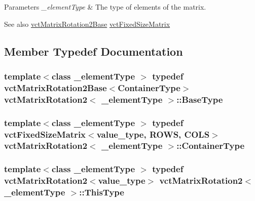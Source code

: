 \begin{DoxyParams}{Parameters}
{\em \+\_\+element\+Type} & The type of elements of the matrix.\\
\hline
\end{DoxyParams}
\begin{DoxySeeAlso}{See also}
\hyperlink{classvct_matrix_rotation2_base}{vct\+Matrix\+Rotation2\+Base} \hyperlink{classvct_fixed_size_matrix}{vct\+Fixed\+Size\+Matrix} 
\end{DoxySeeAlso}


\subsection{Member Typedef Documentation}
\hypertarget{classvct_matrix_rotation2_a6d9fad3de3e445606a22bf1a3e9da631}{}
\subsubsection[{Base\+Type}]{\setlength{\rightskip}{0pt plus 5cm}template$<$class \+\_\+element\+Type $>$ typedef {\bf vct\+Matrix\+Rotation2\+Base}$<${\bf Container\+Type}$>$ {\bf vct\+Matrix\+Rotation2}$<$ \+\_\+element\+Type $>$\+::{\bf Base\+Type}}\label{classvct_matrix_rotation2_a6d9fad3de3e445606a22bf1a3e9da631}
\hypertarget{classvct_matrix_rotation2_ab84e040499a56ef9c8ab6b3a57e09479}{}
\subsubsection[{Container\+Type}]{\setlength{\rightskip}{0pt plus 5cm}template$<$class \+\_\+element\+Type $>$ typedef {\bf vct\+Fixed\+Size\+Matrix}$<$value\+\_\+type, {\bf R\+O\+W\+S}, {\bf C\+O\+L\+S}$>$ {\bf vct\+Matrix\+Rotation2}$<$ \+\_\+element\+Type $>$\+::{\bf Container\+Type}}\label{classvct_matrix_rotation2_ab84e040499a56ef9c8ab6b3a57e09479}
\hypertarget{classvct_matrix_rotation2_a5129223265a26c20222068fee4733dd1}{}
\subsubsection[{This\+Type}]{\setlength{\rightskip}{0pt plus 5cm}template$<$class \+\_\+element\+Type $>$ typedef {\bf vct\+Matrix\+Rotation2}$<$value\+\_\+type$>$ {\bf vct\+Matrix\+Rotation2}$<$ \+\_\+element\+Type $>$\+::{\bf This\+Type}}\label{classvct_matrix_rotation2_a5129223265a26c20222068fee4733dd1}
\hypertarget{classvct_matrix_rotation2_aaa741677f3a705c18adc25e022a5fa5c}{}
